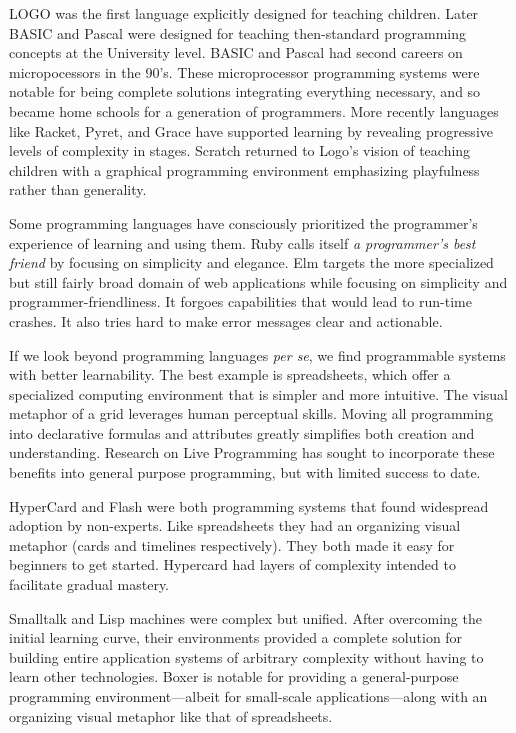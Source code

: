 \documentclass[english,submission]{programming}
\begin{document}
LOGO was the first language explicitly designed for teaching children.
Later BASIC and Pascal were designed for teaching then-standard
programming concepts at the University level. BASIC and Pascal had
second careers on micropocessors in the 90's. These microprocessor
programming systems were notable for being complete solutions
integrating everything necessary, and so became home schools for a
generation of programmers. More recently languages like Racket, Pyret,
and Grace have supported learning by revealing progressive levels of
complexity in stages. Scratch returned to Logo's vision of teaching
children with a graphical programming environment emphasizing
playfulness rather than generality.

Some programming languages have consciously prioritized the programmer's
experience of learning and using them. Ruby calls itself \emph{a
programmer's best friend} by focusing on simplicity and elegance. Elm
targets the more specialized but still fairly broad domain of web
applications while focusing on simplicity and programmer-friendliness.
It forgoes capabilities that would lead to run-time crashes. It also
tries hard to make error messages clear and actionable.

If we look beyond programming languages \emph{per se}, we find
programmable systems with better learnability. The best example is
spreadsheets, which offer a specialized computing environment that is
simpler and more intuitive. The visual metaphor of a grid leverages
human perceptual skills. Moving all programming into declarative
formulas and attributes greatly simplifies both creation and
understanding. Research on Live Programming
\cite{Hancock2003,BretVictor} has sought to incorporate these benefits
into general purpose programming, but with limited success to date.

HyperCard and Flash were both programming systems that found widespread
adoption by non-experts. Like spreadsheets they had an organizing visual
metaphor (cards and timelines respectively). They both made it easy for
beginners to get started. Hypercard had layers of complexity intended to
facilitate gradual mastery.

Smalltalk and Lisp machines were complex but unified. After overcoming
the initial learning curve, their environments provided a complete
solution for building entire application systems of arbitrary complexity
without having to learn other technologies. Boxer \cite{BoxerDesign} is
notable for providing a general-purpose programming environment---albeit
for small-scale applications---along with an organizing visual metaphor
like that of spreadsheets.
\end{document}
